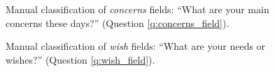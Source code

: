 \begin{figure}[h!]
    \caption[Manual classification of \textit{concerns} fields]{Manual classification of \textit{concerns} fields: ``What are your main concerns these days?'' (Question \ref{q:concerns_field}).
    }\label{fig:concerns_field}
\end{figure}

\begin{figure}[h!]
    \caption[Manual classification of \textit{wish} fields]{Manual classification of \textit{wish} fields: ``What are your needs or wishes?'' (Question \ref{q:wish_field}).
    }\label{fig:wish_field}
\end{figure}

